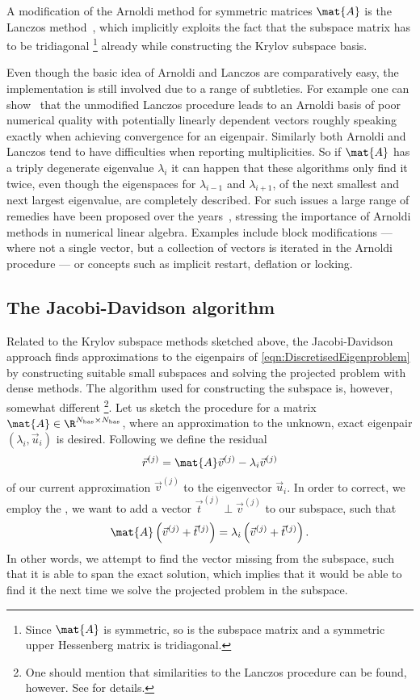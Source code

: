 A modification of the Arnoldi method for symmetric matrices $\mat{A}$
is the Lanczos method~\cite{Lanczos1950},
which implicitly exploits the fact
that the subspace matrix has to be tridiagonal%
\footnote{Since $\mat{A}$ is symmetric, so is the subspace matrix
and a symmetric upper Hessenberg matrix is tridiagonal.}
already while constructing the Krylov subspace basis.

Even though the basic idea of Arnoldi and Lanczos are comparatively easy,
the implementation is still involved
due to a range of subtleties.
For example one can show~\cite{Arbenz2010} that the unmodified
Lanczos procedure
leads to an Arnoldi basis of poor numerical quality
with potentially linearly dependent vectors
roughly speaking
exactly when achieving convergence for an eigenpair.
Similarly both Arnoldi and Lanczos tend to have difficulties
when reporting multiplicities.
So if $\mat{A}$ has a triply degenerate eigenvalue $\lambda_i$
it can happen that these algorithms only find it twice,
even though the eigenspaces for $\lambda_{i-1}$
and $\lambda_{i+1}$,
\ie of the next smallest and next largest eigenvalue,
are completely described.
For such issues a large range of remedies have been proposed
over the years~\cite{Arbenz2010,Saad2011},
stressing the importance of Arnoldi methods in numerical linear algebra.
Examples include block modifications ---
where not a single vector, but a collection of vectors is iterated
in the Arnoldi procedure ---
or concepts such as implicit restart, deflation or locking.

\subsection{The Jacobi-Davidson algorithm}
\label{sec:Davidson}
Related to the Krylov subspace methods
sketched above, the Jacobi-Davidson approach
finds approximations to the eigenpairs of \eqref{eqn:DiscretisedEigenproblem}
by constructing suitable small subspaces
and solving the projected problem with dense methods.
The algorithm used for constructing the subspace is, however,
somewhat different%
\footnote{One should mention that similarities to the Lanczos procedure
	can be found, however. See \cite{Arbenz2010} for details.}.
Let us sketch the procedure for a matrix $\mat{A} \in \R^{\Nbas \times \Nbas}$,
where an approximation to the unknown, exact eigenpair $(\lambda_i, \vec{u}_i)$
is desired.
Following \citet{Davidson1975} we define the residual
\begin{equation}
	\vec{r}^{(j)} = \mat{A} \vec{v}^{(j)} - \lambda_i \vec{v}^{(j)}
	\label{eqn:DavidsonResidual}
\end{equation}
of our current approximation $\vec{v}^{(j)}$ to the eigenvector $\vec{u}_i$.
In order to correct, we employ the
,
\ie we want to add a vector $\vec{t}^{(j)} \perp \vec{v}^{(j)}$ to our
subspace, such that
\[
	\mat{A} \left(\vec{v}^{(j)} + \vec{t}^{(j)}\right) = \lambda_i \left(\vec{v}^{(j)} + \vec{t}^{(j)}\right).
\]
In other words, we attempt to find the vector missing from the subspace,
such that it is able to span the exact solution,
which implies that it would be able to find it the next time
we solve the projected problem in the subspace.

